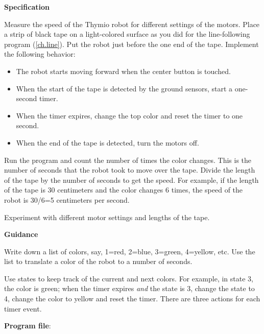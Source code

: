 \label{ch.speed}

\textbf{Specification}

Measure the speed of the Thymio robot for different settings of the
motors. Place a strip of black tape on a light-colored surface as you
did for the line-following program (\cref{ch.line}). Put the robot just
before the one end of the tape. Implement the following behavior:

\begin{itemize}

\item The robot starts moving forward when the center button is touched.

\item When the start of the tape is detected by the ground sensors,
start a one-second timer.

\item When the timer expires, change the top color and reset the timer
to one second.

\item When the end of the tape is detected, turn the motors off.

\end{itemize} 

Run the program and count the number of times the color changes. This is
the number of seconds that the robot took to move over the tape. Divide
the length of the tape by the number of seconds to get the speed. For
example, if the length of the tape is 30 centimeters and the color
changes 6 times, the speed of the robot is 30/6=5 centimeters per
second.

Experiment with different motor settings and lengths of the tape.

\textbf{Guidance}

Write down a list of colors, say, 1=red, 2=blue, 3=green, 4=yellow, etc.
Use the list to translate a color of the robot to a number of seconds.

Use states to keep track of the current and next colors. For example, in
state 3, the color is green; when the timer expires \emph{and} the state
is 3, change the state to 4, change the color to yellow and reset the
timer. There are three actions for each timer event.

\bigskip

{\raggedleft \hfill \textbf{Program file}: }
